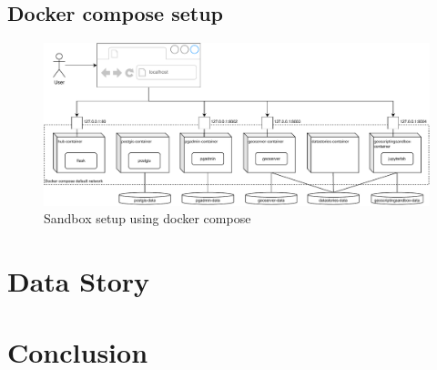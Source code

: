 \documentclass[11pt, a4paper, oneside, parskip=full-]{scrartcl}
\begin{document}
\subsection{Docker compose setup}
\begin{figure}[h]
  \centering
  \includegraphics[width=1\textwidth]{compose_setup}
  \caption{Sandbox setup using docker compose}
  \label{fig:sandboxsetup}
\end{figure}

\section{Data Story}

\section{Conclusion}
\end{document}
